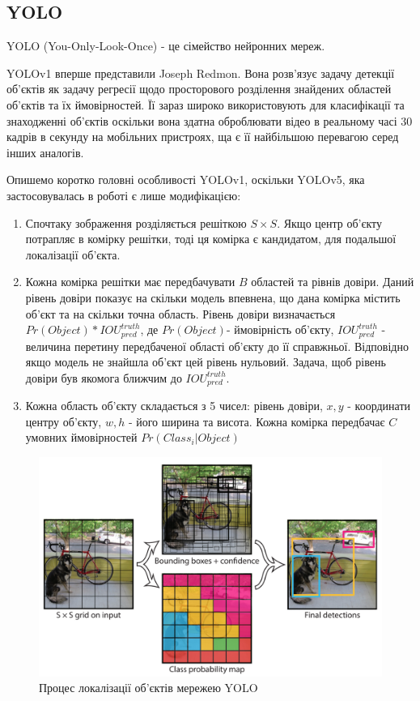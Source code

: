 \subsection{YOLO}

YOLO (You-Only-Look-Once) - це сімейство нейронних мереж.

YOLOv1 вперше представили Joseph Redmon.
Вона розв'язує задачу детекції об'єктів як задачу регресії
щодо просторового розділення знайдених областей об'єктів та їх
ймовірностей. Її зараз широко використовують для класифікації та знаходженні об'єктів
оскільки вона здатна оброблювати відео в реальному часі 30 кадрів в секунду
на мобільних пристроях, ща є її найбільшою перевагою серед інших аналогів.

Опишемо коротко головні особливості YOLOv1, оскільки YOLOv5, яка застосовувалась
в роботі є лише модифікацією:
\begin{enumerate}
    \item Спочтаку зображення розділяється решіткою $S \times S$.
          Якщо центр об'єкту потрапляє в комірку решітки, тоді ця комірка
          є кандидатом, для подальшої локалізації об'єкта.
    \item Кожна комірка решітки має передбачувати $B$ областей та рівнів
          довіри. Даний рівень довіри показує на скільки модель впевнена,
          що дана комірка містить об'єкт та на скільки точна область.
          Рівень довіри визначається $Pr(Object)*{IOU}_{pred}^{truth}$,
          де $Pr(Object)$- ймовірність об'єкту, ${IOU}_{pred}^{truth}$ - величина
          перетину передбаченої області об'єкту до її справжньої.
          Відповідно якщо модель не знайшла об'єкт цей рівень нульовий.
          Задача, щоб рівень довіри був якомога ближчим до ${IOU}_{pred}^{truth}$.
    \item Кожна область об'єкту складається з 5 чисел: рівень довіри,
          $x, y$ - координати центру об'єкту,  $w, h$ - його ширина та висота.
          Кожна комірка передбачає $C$ умовних ймовірностей $Pr(Class_i|Object)$
\end{enumerate}

\begin{figure}[H]
    \includegraphics[width=0.5\linewidth]{images/cnn_yolo1}
    \centering
    \caption{Процес локалізації об'єктів мережею YOLO \cite{RedmonYolo}
    }
\end{figure}

